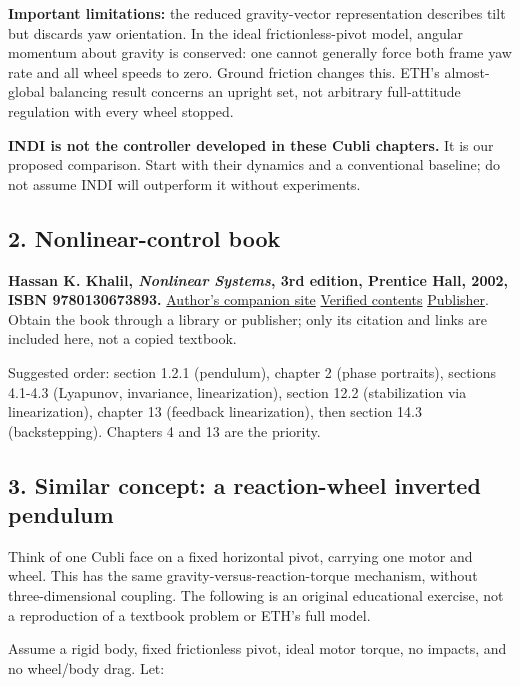 \documentclass[
]{article}
\begin{document}
\textbf{Important limitations:} the reduced gravity-vector
representation describes tilt but discards yaw orientation. In the ideal
frictionless-pivot model, angular momentum about gravity is conserved:
one cannot generally force both frame yaw rate and all wheel speeds to
zero. Ground friction changes this. ETH's almost-global balancing result
concerns an upright set, not arbitrary full-attitude regulation with
every wheel stopped.

\textbf{INDI is not the controller developed in these Cubli chapters.}
It is our proposed comparison. Start with their dynamics and a
conventional baseline; do not assume INDI will outperform it without
experiments.

\subsection{2. Nonlinear-control book}\label{nonlinear-control-book}

\textbf{Hassan K. Khalil, \emph{Nonlinear Systems}, 3rd edition,
Prentice Hall, 2002, ISBN 9780130673893.}
\href{https://www.egr.msu.edu/~khalil/NonlinearSystems/index.html}{Author's
companion site} \textbar{}
\href{https://www.egr.msu.edu/~khalil/NonlinearSystems/contents.html}{Verified
contents} \textbar{}
\href{https://www.pearson.com/en-us/subject-catalog/p/nonlinear-systems/P200000003306/9780130673893}{Publisher}.
Obtain the book through a library or publisher; only its citation and
links are included here, not a copied textbook.

Suggested order: section 1.2.1 (pendulum), chapter 2 (phase portraits),
sections 4.1-4.3 (Lyapunov, invariance, linearization), section 12.2
(stabilization via linearization), chapter 13 (feedback linearization),
then section 14.3 (backstepping). Chapters 4 and 13 are the priority.

\subsection{3. Similar concept: a reaction-wheel inverted
pendulum}\label{similar-concept-a-reaction-wheel-inverted-pendulum}

Think of one Cubli face on a fixed horizontal pivot, carrying one motor
and wheel. This has the same gravity-versus-reaction-torque mechanism,
without three-dimensional coupling. The following is an original
educational exercise, not a reproduction of a textbook problem or ETH's
full model.

Assume a rigid body, fixed frictionless pivot, ideal motor torque, no
impacts, and no wheel/body drag. Let:
\end{document}
